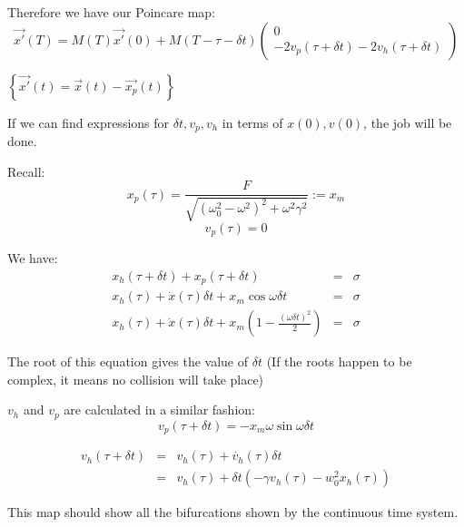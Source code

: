 \documentclass[xcolor=x11names,compress]{beamer}
\renewcommand{\(}{\begin{columns}}
\renewcommand{\)}{\end{columns}}
\newcommand{\<}[1]{\begin{column}{#1}}
\renewcommand{\>}{\end{column}}
\newcommand{\colv}[2]{\begin{pmatrix}#1\\#2\end{pmatrix}}
\begin{document}
\begin{frame}
Therefore we have our Poincare map:
\begin{equation}
\label{poincare-hardcol}
\vec{x'}(T)=M(T)\vec{x'}(0)+M(T-\tau-\delta t)\colv{0}{-2v_p(\tau+\delta t)-2v_h(\tau+\delta t)}
\end{equation}

$\left\{\vec{x'}(t)=\vec{x}(t)-\vec{x_p}(t)\right\}$

If we can find expressions for $\delta t, v_p, v_h$ in terms of $x(0),v(0)$, 
the job will be done.  
\end{frame}

\begin{frame}
Recall:
\[
x_p(\tau)=\frac{F}{\sqrt{(\omega_0^2-\omega^2)^2+\omega^2\gamma^2}}:=x_m
\]
\[
v_p(\tau)=0
\]

We have:
\begin{eqnarray*}
x_h(\tau+\delta t)+x_p(\tau+\delta t)&=&\sigma\\
x_h(\tau)+\dot{x}(\tau)\delta t+x_m\cos{\omega \delta t}&=&\sigma\\
x_h(\tau)+\dot{x}(\tau)\delta t+x_m\left(1-\frac{(\omega \delta t)^2}{2}\right)&=&\sigma
\end{eqnarray*}

The root of this equation gives the value of $\delta t$
(If the roots happen to be complex, it means no collision will take place)
\end{frame}

\begin{frame}
$v_h$ and $v_p$ are calculated in a similar fashion:
\[
v_p(\tau+\delta t)=-x_m\omega\sin{\omega\delta t}
\]

\begin{eqnarray*}
v_h(\tau+\delta t)&=&v_h(\tau)+\dot{v_h}(\tau)\delta t\\
&=&v_h(\tau)+\delta t(-\gamma v_h(\tau)-w_0^2x_h(\tau))
\end{eqnarray*}

This map should show all the bifurcations shown by the continuous time system.  
\end{frame}
\end{document}
